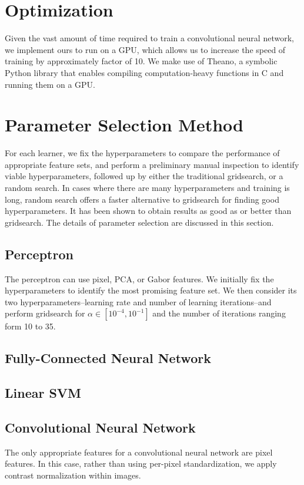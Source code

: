 \documentclass{acm_proc_article-sp}
\begin{document}
\section{Optimization} %
Given the vast amount of time required to train a convolutional neural network, we implement ours to run on a GPU, which allows us to increase the speed of training by approximately factor of 10. We make use of Theano\cite{Theano}, a symbolic Python library that enables compiling computation-heavy functions in C and running them on a GPU.

\section{Parameter Selection Method}%
For each learner, we fix the hyperparameters to compare the performance of appropriate feature sets, and perform a preliminary manual inspection to identify viable hyperparameters, followed up by either the traditional gridsearch, or a random search. In cases where there are many hyperparameters and training is long, random search offers a faster alternative to gridsearch for finding good hyperparameters. It has been shown to obtain results as good as or better than gridsearch\cite{Bergstra}. The details of parameter selection are discussed in this section.

\subsection{Perceptron}
The perceptron can use pixel, PCA, or Gabor features. We initially fix the hyperparameters to identify the most promising feature set. We then consider its two hyperparameters--learning rate and number of learning iterations--and perform gridsearch for $\alpha \in [10^{-4},10^{-1}]$ and the number of iterations ranging form 10 to 35.

\subsection{Fully-Connected Neural Network}

\subsection{Linear SVM}

\subsection{Convolutional Neural Network}
The only appropriate features for a convolutional neural network are pixel features. In this case, rather than using per-pixel standardization, we apply contrast normalization within images.
\end{document}
